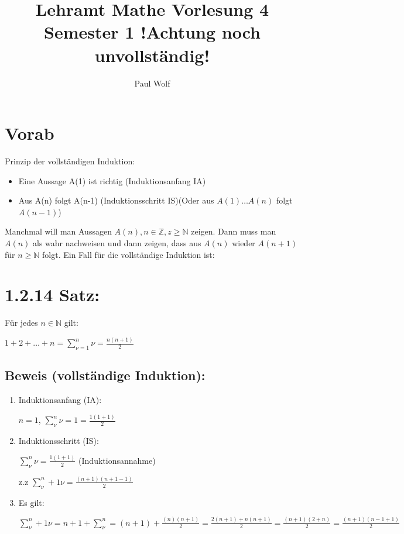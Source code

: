 \documentclass[11pt]{scrartcl}
\title{Lehramt Mathe Vorlesung 4 Semester 1 !Achtung noch unvollständig!}
\author{Paul Wolf}
\begin{document}
\maketitle
\tableofcontents

\section{Vorab}
\label{sec:vorab-1.2.14}

Prinzip der vollständigen Induktion:
\begin{itemize}
\item Eine Aussage A(1) ist richtig (Induktionsanfang IA)
\item Aus A(n) folgt A(n-1) (Induktionsschritt IS)(Oder aus $A(1)\dots A(n)$ folgt $A(n-1)$)
\end{itemize}
Manchmal will man Aussagen $ A(n), n \in \mathbb{Z} , z \geq \mathbb{N} $ zeigen. Dann muss man $A(n)$ als wahr nachweisen und dann zeigen, dass aus $A(n)$ wieder $A(n+1) $ für $n \geq \mathbb{N}$ folgt. Ein Fall für die vollständige Induktion ist:


\section{1.2.14 Satz:}
\label{sec:satz-1.2.14}

Für jedes $n \in \mathbb{N}$ gilt:

$1+2+\dots+n = \sum \limits_{\nu=1}^n \nu = \frac{n(n+1)}{2} $

\subsection*{Beweis (vollständige Induktion):}

\begin{enumerate}
\item Induktionsanfang (IA):

$n=1$,
$\sum \limits_{ \nu}^n \nu = 1 = \frac{1(1+1)}{2}$

\item Induktionsschritt (IS):

$\sum \limits_{ \nu}^n \nu = \frac{1(1+1)}{2}$ (Induktionsannahme)

z.z $\sum \limits_{ \nu}^n+1 \nu = \frac{(n+1)(n+1-1)}{2}$

\item Es gilt:

$\sum \limits_{ \nu}^n+1 \nu = n+1+\sum \limits_{ \nu}^n = (n+1) + \frac{(n)(n+1)}{2} = \frac{2(n+1)+n(n+1)}{2} = \frac{(n+1)(2+n)}{2}= \frac{(n+1)(n-1+1)}{2} $


\end{enumerate}
\end{document}
